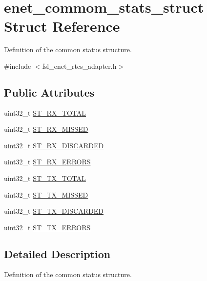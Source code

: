 \hypertarget{structenet__commom__stats__struct}{}\section{enet\+\_\+commom\+\_\+stats\+\_\+struct Struct Reference}
\label{structenet__commom__stats__struct}


Definition of the common status structure.  




{\ttfamily \#include $<$fsl\+\_\+enet\+\_\+rtcs\+\_\+adapter.\+h$>$}

\subsection*{Public Attributes}
\begin{DoxyCompactItemize}
\item 
uint32\+\_\+t \hyperlink{structenet__commom__stats__struct_a1845e0f0e94379dd4d7b2416979bf4e4}{S\+T\+\_\+\+R\+X\+\_\+\+T\+O\+T\+AL}
\item 
uint32\+\_\+t \hyperlink{structenet__commom__stats__struct_a34f557e9303ac2477d88f1f80c3985fb}{S\+T\+\_\+\+R\+X\+\_\+\+M\+I\+S\+S\+ED}
\item 
uint32\+\_\+t \hyperlink{structenet__commom__stats__struct_a5b78bdfeb85ecef985842dff91471a6a}{S\+T\+\_\+\+R\+X\+\_\+\+D\+I\+S\+C\+A\+R\+D\+ED}
\item 
uint32\+\_\+t \hyperlink{structenet__commom__stats__struct_a71fe9730633a7a2cf186e6c6aa369992}{S\+T\+\_\+\+R\+X\+\_\+\+E\+R\+R\+O\+RS}
\item 
uint32\+\_\+t \hyperlink{structenet__commom__stats__struct_a65c77b4c4e84dcb2eb6fc7ded173cb54}{S\+T\+\_\+\+T\+X\+\_\+\+T\+O\+T\+AL}
\item 
uint32\+\_\+t \hyperlink{structenet__commom__stats__struct_a2eeaada0558d2fcbcf8e76230213ec70}{S\+T\+\_\+\+T\+X\+\_\+\+M\+I\+S\+S\+ED}
\item 
uint32\+\_\+t \hyperlink{structenet__commom__stats__struct_ac1a696d6633dcad2b6daa1a833601db0}{S\+T\+\_\+\+T\+X\+\_\+\+D\+I\+S\+C\+A\+R\+D\+ED}
\item 
uint32\+\_\+t \hyperlink{structenet__commom__stats__struct_a451c73f8f99aa98aefdd9670c1200415}{S\+T\+\_\+\+T\+X\+\_\+\+E\+R\+R\+O\+RS}
\end{DoxyCompactItemize}


\subsection{Detailed Description}
Definition of the common status structure. 

